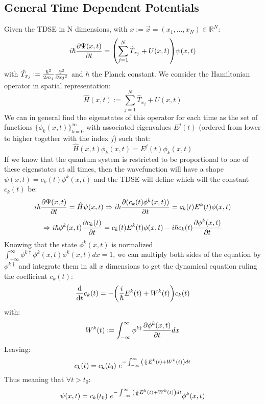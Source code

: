 \documentclass[11pt, a4paper]{article} %
\newcommand{\R}{\mathbb{R}} %
\begin{document}
\subsection{General Time Dependent Potentials}
Given the TDSE in N dimensions, with $x:=\vec{x}=(x_1,...,x_N)\in \R^N$:
\begin{equation}
i\hbar \pdv{\Psi(x,t)}{t}=\qty( \sum_{j=1}^N\hat{T}_{x_j}+U(x, t) )\psi(x,t)
\end{equation}
with $\hat{T}_{x_j}:=\frac{\hbar^2}{2m_j}\pdv[2]{}{xj}$ and $\hbar$ the Planck constant. We consider the Hamiltonian operator in spatial representation:
\begin{equation}
\hat{H}(x,t):=\sum_{j=1}^N\hat{T}_{x_j}+U(x, t)
\end{equation}
We can in general find the eigenstates of this operator for each time as the set of functions $\{\phi_k(x,t)\}_{k=0}^\infty$ with associated eigenvalues $E^j(t)$ (ordered from lower to higher together with the index $j$) such that:
\begin{equation}
\hat{H}(x,t)\phi_k(x,t)=E^j(t)\phi_k(x,t)
\end{equation}
If we know that the quantum system is restricted to be proportional to one of these eigenstates at all times, then the wavefunction will have a shape $\psi(x,t)=c_k(t)\phi^k(x,t)$ and the TDSE will define which will the constant $c_k(t)$ be:
\begin{equation}
i\hbar \pdv{\Psi(x,t)}{t}=\hat{H}\psi(x,t)\Rightarrow i\hbar \pdv{(c_k(t)\phi^k(x,t))}{t}=c_k(t)E^k(t)\phi(x,t) 
\end{equation}
$$
\Rightarrow i\hbar \phi^k(x,t)\pdv{c_k(t)}{t}=c_k(t)E^k(t)\phi(x,t)-i\hbar  c_k(t)\pdv{\phi^k(x,t)}{t}
$$
Knowing that the state $\phi^k(x,t)$ is normalized $\int_{-\infty}^\infty\phi^{k \dagger}\phi^k(x,t)\phi^k(x,t)dx=1$, we can multiply both sides of the equation by $\phi^{k \dagger}$ and integrate them in all $x$ dimensions to get the dynamical equation ruling the coefficient $c_k(t)$:
\begin{equation}
\dv{}{t}c_k(t)=-\qty(\frac{i}{\hbar}E^k(t) + W^k(t) )c_k(t)
\end{equation}
with:
\begin{equation}
W^k(t):=\int_{-\infty}^\infty\phi^{k \dagger} \pdv{\phi^k(x,t)}{t} dx
\end{equation}
Leaving:
\begin{equation}
c_k(t)=c_k(t_0)\ e^{-\int_{-\infty}^\infty \qty(\frac{i}{\hbar}E^k(t) + W^k(t) )dt}
\end{equation}
Thus meaning that $\forall t>t_0$:
$$
\psi(x,t)=c_k(t_0)\ e^{-\int_{-\infty}^\infty \qty(\frac{i}{\hbar}E^k(t) + W^k(t) )dt} \phi^k(x,t)
$$
\end{document}
